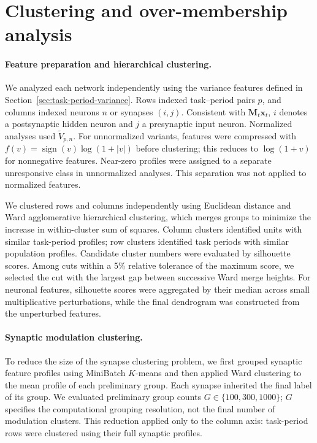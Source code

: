 \documentclass{article}
\begin{document}
\section{Clustering and over-membership analysis}
\label{sec:clustering-over-membership}

\paragraph{Feature preparation and hierarchical clustering.}
We analyzed each network independently using the variance features defined
in Section~\ref{sec:task-period-variance}. Rows indexed task--period pairs
$p$, and columns indexed neurons $n$ or synapses $(i,j)$. Consistent with
$\mathbf{M}_t\mathbf{x}_t$, $i$ denotes a postsynaptic hidden neuron and
$j$ a presynaptic input neuron. Normalized analyses used
$\widetilde{V}_{p,n}$. For unnormalized variants, features were compressed
with $f(v)=\operatorname{sign}(v)\log(1+|v|)$ before clustering; this reduces
to $\log(1+v)$ for nonnegative features. Near-zero profiles were assigned
to a separate unresponsive class in unnormalized analyses. This separation
was not applied to normalized features.

We clustered rows and columns independently using Euclidean distance and
Ward agglomerative hierarchical clustering, which merges groups to minimize
the increase in within-cluster sum of squares. Column clusters identified
units with similar task-period profiles; row clusters identified task
periods with similar population profiles. Candidate cluster numbers were
evaluated by silhouette scores. Among cuts within a 5\% relative tolerance
of the maximum score, we selected the cut with the largest gap between
successive Ward merge heights. For neuronal features, silhouette scores
were aggregated by their median across small multiplicative perturbations,
while the final dendrogram was constructed from the unperturbed features.

\paragraph{Synaptic modulation clustering.}
To reduce the size of the synapse clustering problem, we first grouped
synaptic feature profiles using MiniBatch $K$-means and then applied Ward
clustering to the mean profile of each preliminary group. Each synapse
inherited the final label of its group. We evaluated preliminary group
counts $G\in\{100,300,1000\}$; $G$ specifies the computational grouping
resolution, not the final number of modulation clusters. This reduction
applied only to the column axis: task-period rows were clustered using
their full synaptic profiles.
\end{document}

